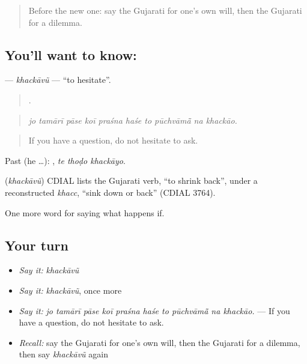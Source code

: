 \label{lesson:GU-C389-khackavu}



\begin{quote}
Before the new one: say the Gujarati for one's own will, then the Gujarati for a dilemma.
\end{quote}

\subsection*{You'll want to know: }
\textbf{} — \emph{khackāvũ} — \textquotedblleft{}to hesitate\textquotedblright{}.

\begin{quote}
         .
\end{quote}

\begin{quote}
\emph{jo tamārī pāse koī praśna haśe to pūchvāmā̃ na khackāo.}
\end{quote}

\begin{quote}
If you have a question, do not hesitate to ask.
\end{quote}

Past (he …):   , \emph{te thoḍo khackāyo}.

\begin{cousinweb}
\textbf{} (\emph{khackāvũ}) CDIAL lists the Gujarati verb, \textquotedblleft{}to shrink back\textquotedblright{}, under a reconstructed \emph{khacc}, \textquotedblleft{}sink down or back\textquotedblright{} (CDIAL 3764).
\end{cousinweb}

\begin{grammarlens}[title={What you've built}]
One more word for saying what happens if.
\end{grammarlens}

\subsection*{Your turn}
\begin{itemize}
\raggedright
  \item \emph{Say it:} \emph{khackāvũ}
  \item \emph{Say it:} \emph{khackāvũ}, once more
  \item \emph{Say it:} \emph{jo tamārī pāse koī praśna haśe to pūchvāmā̃ na khackāo.} — If you have a question, do not hesitate to ask.
  \item \emph{Recall:} say the Gujarati for one's own will, then the Gujarati for a dilemma, then say \emph{khackāvũ} again
\end{itemize}

